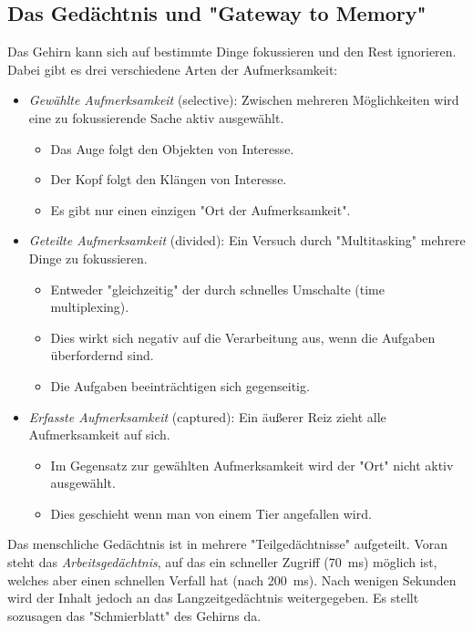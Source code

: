 		\subsection{Das Gedächtnis und "Gateway to Memory"}
			Das Gehirn kann sich auf bestimmte Dinge fokussieren und den Rest ignorieren. Dabei gibt es drei verschiedene Arten der Aufmerksamkeit:
			\begin{itemize}
				\item \emph{Gewählte Aufmerksamkeit} (selective): Zwischen mehreren Möglichkeiten wird eine zu fokussierende Sache aktiv ausgewählt.
					\begin{itemize}
						\item Das Auge folgt den Objekten von Interesse.
						\item Der Kopf folgt den Klängen von Interesse.
						\item Es gibt nur einen einzigen "Ort der Aufmerksamkeit".
					\end{itemize}
				\item \emph{Geteilte Aufmerksamkeit} (divided): Ein Versuch durch "Multitasking" mehrere Dinge zu fokussieren.
					\begin{itemize}
						\item Entweder "gleichzeitig" der durch schnelles Umschalte (time multiplexing).
						\item Dies wirkt sich negativ auf die Verarbeitung aus, wenn die Aufgaben überfordernd sind.
						\item Die Aufgaben beeinträchtigen sich gegenseitig.
					\end{itemize}
				\item \emph{Erfasste Aufmerksamkeit} (captured): Ein äußerer Reiz zieht alle Aufmerksamkeit auf sich.
					\begin{itemize}
						\item Im Gegensatz zur gewählten Aufmerksamkeit wird der "Ort" nicht aktiv ausgewählt.
						\item Dies geschieht \zB wenn man von einem Tier angefallen wird.
					\end{itemize}
			\end{itemize}
		
			Das menschliche Gedächtnis ist in mehrere "Teilgedächtnisse" aufgeteilt. Voran steht das \emph{Arbeitsgedächtnis}, auf das ein schneller Zugriff (\ca \SI{70}{\milli\second}) möglich ist, welches aber einen schnellen Verfall hat (nach \ca \SI{200}{\milli\second}). Nach wenigen Sekunden wird der Inhalt jedoch an das Langzeitgedächtnis weitergegeben. Es stellt sozusagen das "Schmierblatt" des Gehirns da.
			
